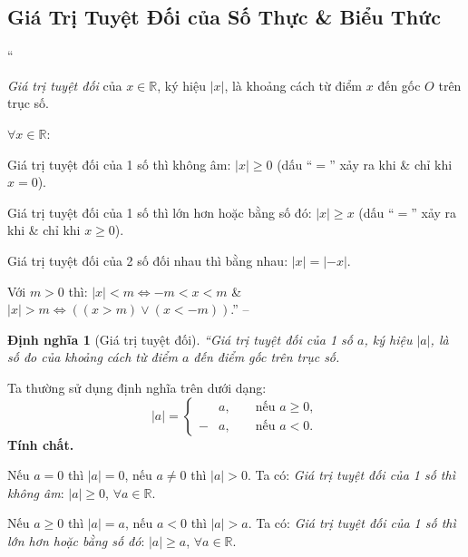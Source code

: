 \documentclass{article}
\numberwithin{equation}{section}
\newtheorem{dinhnghia}{Định nghĩa}[section]
\begin{document}
\subsection{Giá Trị Tuyệt Đối của  Số Thực \& Biểu Thức}
``\begin{enumerate*}
	\item[\textbf{1.}] \textit{Giá trị tuyệt đối} của $x\in\mathbb{R}$, ký hiệu $|x|$, là khoảng cách từ điểm $x$ đến gốc $O$ trên trục số.
	\item[\textbf{2.}] $\forall x\in\mathbb{R}$:
	\begin{enumerate*}
		\item[$\bullet$] Giá trị tuyệt đối của 1 số thì không âm: $|x|\ge 0$ (dấu ``$=$'' xảy ra khi \& chỉ khi $x = 0$).
		\item[$\bullet$] Giá trị tuyệt đối của 1 số thì lớn hơn hoặc bằng số đó: $|x|\ge x$ (dấu ``$=$'' xảy ra khi \& chỉ khi $x\ge 0$).
		\item[$\bullet$] Giá trị tuyệt đối của 2 số đối nhau thì bằng nhau: $|x| = |-x|$.
	\end{enumerate*}
\end{enumerate*}
Với $m > 0$ thì: $|x| < m\Leftrightarrow -m < x < m$ \& $|x| > m\Leftrightarrow((x > m)\lor(x < - m))$.'' -- \cite[Chap. 2, \S3, pp. 21--22]{Tuyen_Toan_7}

\begin{dinhnghia}[Giá trị tuyệt đối]
	``\emph{Giá trị tuyệt đối} của 1 số $a$, ký hiệu $|a|$, là số đo của khoảng cách từ điểm $a$ đến điểm gốc trên trục số.
\end{dinhnghia}
Ta thường sử dụng định nghĩa trên dưới dạng:
\begin{equation*}
	|a| = \left\{\begin{split}
		&a,&&\mbox{ nếu }a\ge 0,\\
		-&a,&&\mbox{ nếu }a < 0.
	\end{split}\right.
\end{equation*}
\textbf{Tính chất.}
\begin{enumerate*}
	\item[$\bullet$] Nếu $a = 0$ thì $|a| = 0$, nếu $a\ne 0$ thì $|a| > 0$. Ta có: \textit{Giá trị tuyệt đối của 1 số thì không âm}: $|a|\ge 0$, $\forall a\in\mathbb{R}$.
	\item[$\bullet$] Nếu $a\ge 0$ thì $|a| = a$, nếu $a < 0$ thì $|a| > a$. Ta có: \textit{Giá trị tuyệt đối của 1 số thì lớn hơn hoặc bằng số đó}: $|a|\ge a$, $\forall a\in\mathbb{R}$.
\end{enumerate*}
\end{document}
